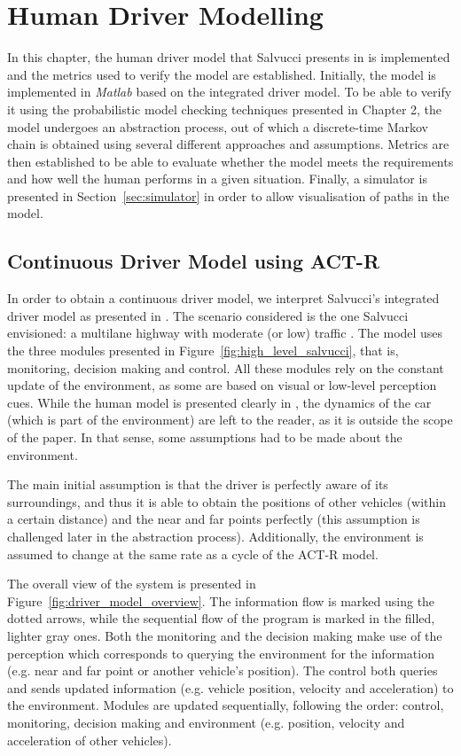 \chapter{Human Driver Modelling}

In this chapter, the human driver model that Salvucci presents in \cite{salvucci_1} is implemented and the metrics used to verify the model are established. Initially, the model is implemented in \textit{Matlab} based on the integrated driver model. To be able to verify it using the probabilistic model checking techniques presented in Chapter 2, the model undergoes an abstraction process, out of which a discrete-time Markov chain is obtained using several different approaches and assumptions. Metrics are then established to be able to evaluate whether the model meets the requirements and how well the human performs in a given situation. Finally, a simulator is presented in Section~\ref{sec:simulator} in order to allow visualisation of paths in the model.

\section{Continuous Driver Model using ACT-R}

In order to obtain a continuous driver model, we interpret Salvucci's integrated driver model as presented in \cite{salvucci_1}. The scenario considered is the one Salvucci envisioned: a multilane highway with moderate (or low) traffic \cite{salvucci_1}. The model uses the three modules presented in Figure~\ref{fig:high_level_salvucci}, that is, monitoring, decision making and control. All these modules rely on the constant update of the environment, as some are based on visual or low-level perception cues. While the human model is presented clearly in \cite{salvucci_1}, the dynamics of the car (which is part of the environment) are left to the reader, as it is outside the scope of the paper. In that sense, some assumptions had to be made about the environment.

The main initial assumption is that the driver is perfectly aware of its surroundings, and thus it is able to obtain the positions of other vehicles (within a certain distance) and the near and far points perfectly (this assumption is challenged later in the abstraction process). Additionally, the environment is assumed to change at the same rate as a cycle of the ACT-R model.

The overall view of the system is presented in Figure~\ref{fig:driver_model_overview}. The information flow is marked using the dotted arrows, while the sequential flow of the program is marked in the filled, lighter gray ones. Both the monitoring and the decision making make use of the perception which corresponds to querying the environment for the information (e.g. near and far point or another vehicle's position). The control both queries and sends updated information (e.g. vehicle position, velocity and acceleration) to the environment. Modules are updated sequentially, following the order: control, monitoring, decision making and environment (e.g. position, velocity and acceleration of other vehicles).

